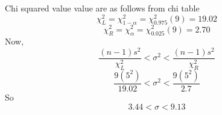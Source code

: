 \documentclass{beamer}
\begin{document}
\begin{frame}
Chi squared value value are as follows from chi table
\begin{equation}
    \chi_{L}^2=\chi_{1-\alpha}^2=\chi_{0.975}^2(9)=19.02
\end{equation}
\begin{equation}
    \chi_{R}^2=\chi_{\alpha}^2=\chi_{0.025}^2(9)=2.70
\end{equation}
Now,
\begin{equation}
    \frac{(n-1)s^2}{\chi_{L}^2} < \sigma^2 < \frac{(n-1)s^2}{\chi_{R}^2}
\end{equation}
\begin{equation}
    \frac{9(5^2)}{19.02} < \sigma^2 < \frac{9(5^2)}{2.7}
\end{equation}
So
\begin{equation}
     3.44 < \sigma < 9.13
\end{equation}

\end{frame}
\end{document}
